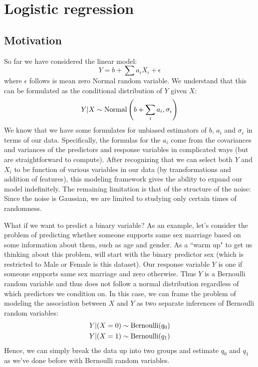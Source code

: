 \chapter{Logistic regression}

\section{Motivation}

So far we have considered the linear model: 
\begin{equation}
Y = b + \sum a_i X_i + \epsilon
\end{equation}
where $\epsilon$ follows is mean zero Normal random variable. We understand that this can be formulated as the conditional distribution of $Y$ given $X$: 
\begin{equation}
Y|X \sim {\rm Normal}\left(b + \sum_i a_i ,\sigma_{\epsilon} \right)
\end{equation}
We know that we have some formulates for unbiased estimators of $b$, $a_i$ and $\sigma_{\epsilon}$ in terms of our data. Specifically, the formulas for the $a_i$ come from the covariances and variances of the predictors and response variables in complicated ways (but are straightforward to compute).  After recognizing that we can select both $Y$ and $X_i$ to be function of various variables in our data (by transformations and addition of features), this modeling framework gives the ability to expand our model indefinitely. The remaining limitation is that of the structure of the noise: Since the noise is Gaussian, we are limited to studying only certain times of randomness. 

What if we want to predict a binary variable?  As an example, let's consider the problem of predicting whether someone supports same sex marriage based on some information about them, such as age and gender. As a ``warm up" to get us thinking about this problem, will start with the binary predictor sex (which is restricted to Male or Female is this dataset). Our response variable $Y$ is one if someone supports same sex marriage and zero otherwise. 
Thus $Y$ is a Bernoulli random variable and thus does not follow a normal distribution regardless of which predictors we condition on. In this case, we can frame the problem of modeling the association between $X$ and $Y$ as two separate inferences of Bernoulli random variables: 
\begin{align}
Y|(X=0) &\sim {\rm Bernoulli}(q_0)\\
Y|(X=1) &\sim {\rm Bernoulli}(q_1)
\end{align}
Hence, we can simply break the data up into two groups and estimate $q_0$ and $q_1$ as we've done before with Bernoulli random variables. 


